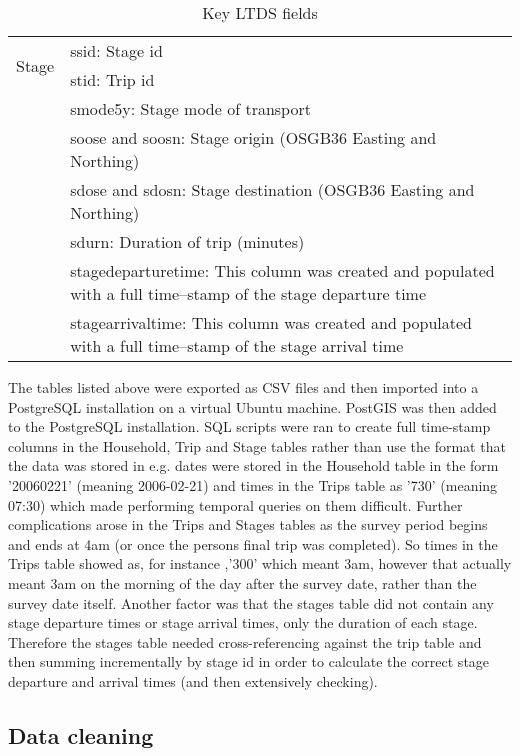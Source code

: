 \begin{center}
\begin{table}[h!]
\begin{tabular}{ | p{2.2cm} | p{12cm} |}
    \multirow{2}{*}{Stage} & ssid: Stage id \\
     & stid: Trip id \\
     & smode5y: Stage mode of transport \\
     & soose and soosn: Stage origin (OSGB36 Easting and Northing) \\
     & sdose and sdosn: Stage destination (OSGB36 Easting and Northing) \\
     & sdurn: Duration of trip (minutes) \\
     & stagedeparturetime: This column was created and populated with a full time--stamp of the stage departure time \\
     & stagearrivaltime: This column was created and populated with a full time--stamp of the stage arrival time \\ \hline
    \end{tabular}
    \caption{Key LTDS fields}
    \label{tab:key_ltds_fields}
\end{table}
\end{center}

The tables listed above were exported as CSV files and then imported into a PostgreSQL installation on a virtual Ubuntu machine. PostGIS was then added to the PostgreSQL installation. SQL scripts were ran to create full time-stamp columns in the Household, Trip and Stage tables rather than use the format that the data was stored in e.g. dates were stored in the Household table in the form '20060221' (meaning 2006-02-21) and times in the Trips table as '730' (meaning 07:30) which made performing temporal queries on them difficult. Further complications arose in the Trips and Stages tables as the survey period begins and ends at 4am (or once the persons final trip was completed). So times in the Trips table showed as, for instance ,'300' which meant 3am, however that actually meant 3am on the morning of the day after the survey date, rather than the survey date itself. Another factor was that the stages table did not contain any stage departure times or stage arrival times, only the duration of each stage. Therefore the stages table needed cross-referencing against the trip table and then summing incrementally by stage id in order to calculate the correct stage departure and arrival times (and then extensively checking).

\subsection{Data cleaning}
\label{sec:reconstruction_data_cleaning}

